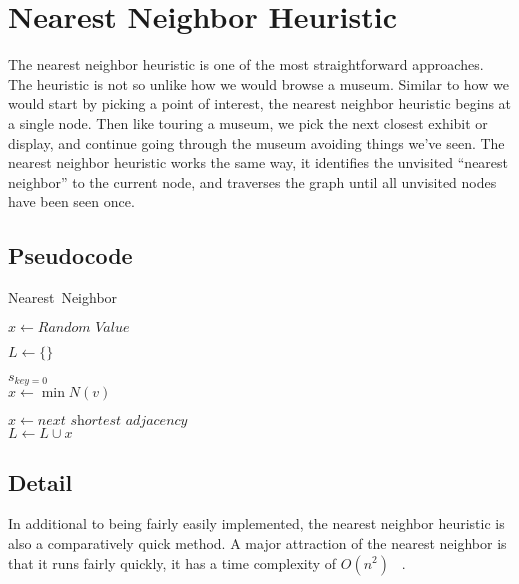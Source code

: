 \documentclass{article}
\begin{document}
\section{Nearest Neighbor Heuristic}

The nearest neighbor heuristic is one of the most straightforward approaches.
The heuristic is not so unlike how we would browse a museum. Similar to how we
would start by picking a point of interest, the nearest neighbor heuristic
begins at a single node. Then like touring a museum, we pick the next closest
exhibit or display, and continue going through the museum avoiding things we’ve
seen. The nearest neighbor heuristic works the same way, it identifies the
unvisited “nearest neighbor” to the current node, and traverses the graph until
all unvisited nodes have been seen once.

\subsection{Pseudocode}

\FloatBarrier

\begin{algorithm}
  \caption{Nearest\ Neighbor}
  \label{alg1}
  \begin{algorithmic}[1]

    \State $x \gets \textit{Random\ Value}$

    \State $L \gets \{\}$

    \State $s_{\textit{key} = 0}$
    \\
        \State $x \gets \min N(v)$

        \Else
          \State $x \gets \textit{next shortest adjacency}$
        \EndIf
      \EndFor
    \EndWhile
    \\
    \State $L \gets L \cup {x}$
    \EndProcedure
  \end{algorithmic}
\end{algorithm}

\FloatBarrier

\subsection{Detail}
In additional to being fairly easily implemented, the nearest neighbor heuristic
is also a comparatively quick method. A major attraction of the nearest neighbor
is that it runs fairly quickly, it has a time complexity of $O(n^2)$
~\cite{nilsson2003heuristics}.\\
\end{document}
